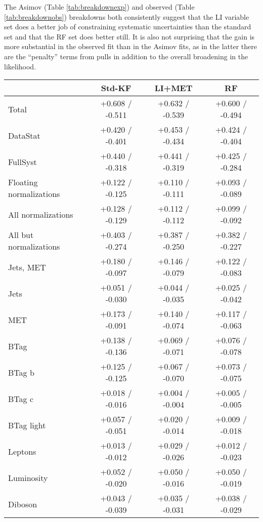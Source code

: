 The Asimov (Table \ref{tab:breakdownexp}) and observed (Table \ref{tab:breakdownobs}) breakdowns both consistently suggest that the LI variable set does a better job of constraining systematic uncertainties than the standard set and that the RF set does better still.  It is also not surprising that the gain is more substantial in the observed fit than in the Asimov fits, as in the latter there are the ``penalty'' terms from pulls in addition to the overall broadening in the likelihood.

\begin{table}[!htbp]\captionsetup{justification=centering}
\begin{center}
\begin{tabular}{lccc}
\hline\hline
 &Std-KF &LI+MET &RF\\
\hline
Total &  +0.608 / -0.511  &  +0.632 / -0.539  &  +0.600 / -0.494 \\
DataStat &  +0.420 / -0.401  &  +0.453 / -0.434  &  +0.424 / -0.404 \\
FullSyst &  +0.440 / -0.318  &  +0.441 / -0.319  &  +0.425 / -0.284 \\
Floating normalizations &  +0.122 / -0.125  &  +0.110 / -0.111  &  +0.093 / -0.089 \\
All normalizations &  +0.128 / -0.129  &  +0.112 / -0.112  &  +0.099 / -0.092 \\
All but normalizations &  +0.403 / -0.274  &  +0.387 / -0.250  &  +0.382 / -0.227 \\
\hline
Jets, MET &  +0.180 / -0.097  &  +0.146 / -0.079  &  +0.122 / -0.083 \\
Jets &  +0.051 / -0.030  &  +0.044 / -0.035  &  +0.025 / -0.042 \\
MET &  +0.173 / -0.091  &  +0.140 / -0.074  &  +0.117 / -0.063 \\
BTag &  +0.138 / -0.136  &  +0.069 / -0.071  &  +0.076 / -0.078 \\
BTag b &  +0.125 / -0.125  &  +0.067 / -0.070  &  +0.073 / -0.075 \\
BTag c &  +0.018 / -0.016  &  +0.004 / -0.004  &  +0.005 / -0.005 \\
BTag light &  +0.057 / -0.051  &  +0.020 / -0.014  &  +0.009 / -0.018 \\
Leptons &  +0.013 / -0.012  &  +0.029 / -0.026  &  +0.012 / -0.023 \\
Luminosity &  +0.052 / -0.020  &  +0.050 / -0.016  &  +0.050 / -0.019 \\
Diboson &  +0.043 / -0.039  &  +0.035 / -0.031  &  +0.038 / -0.029 \\

\end{tabular}
\end{center}
\end{table}
